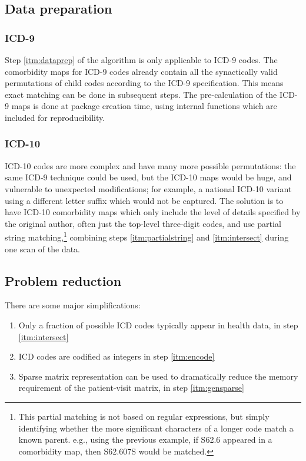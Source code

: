 \documentclass[article]{jss}
\providecommand{\tightlist}{%
  \setlength{\itemsep}{0pt}\setlength{\parskip}{0pt}}
\begin{document}
\subsection{Data preparation}\label{data-preparation}

\subsubsection{ICD-9}\label{icd-9}

Step \ref{itm:dataprep} of the algorithm is only applicable to ICD-9
codes. The comorbidity maps for ICD-9 codes already contain all the
synactically valid permutations of child codes according to the ICD-9
specification. This means exact matching can be done in subsequent
steps. The pre-calculation of the ICD-9 maps is done at package creation
time, using internal functions which are included for reproducibility.

\subsubsection{ICD-10}\label{icd-10}

ICD-10 codes are more complex and have many more possible permutations:
the same ICD-9 technique could be used, but the ICD-10 maps would be
huge, and vulnerable to unexpected modifications; for example, a
national ICD-10 variant using a different letter suffix which would not
be captured. The solution is to have ICD-10 comorbidity maps which only
include the level of details specified by the original author, often
just the top-level three-digit codes, and use partial string
matching,\footnote{This partial matching is not based on regular
  expressions, but simply identifying whether the more significant
  characters of a longer code match a known parent. e.g., using the
  previous example, if S62.6 appeared in a comorbidity map, then
  S62.607S would be matched.} combining steps \ref{itm:partialstring}
and \ref{itm:intersect} during one scan of the data.

\subsection{Problem reduction}\label{problem-reduction}

There are some major simplifications:

\begin{enumerate}
\def\labelenumi{\arabic{enumi}.}
\tightlist
\item
  Only a fraction of possible ICD codes typically appear in health data,
  in step \ref{itm:intersect}
\item
  ICD codes are codified as integers in step \ref{itm:encode}
\item
  Sparse matrix representation can be used to dramatically reduce the
  memory requirement of the patient-visit matrix, in step
  \ref{itm:gensparse}
\end{enumerate}
\end{document}

